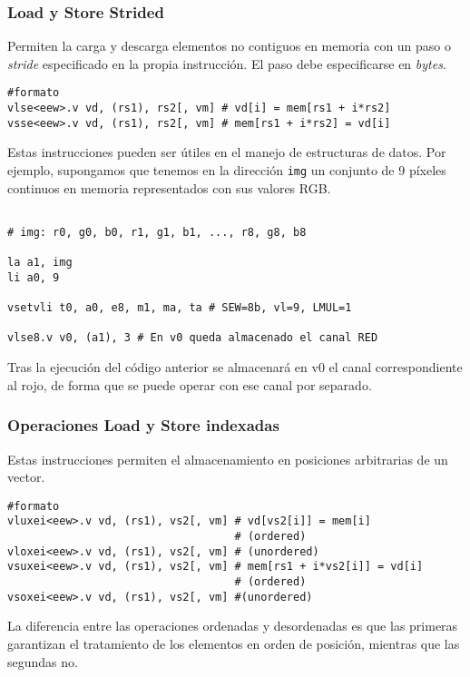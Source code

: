 \subsubsection{Load y Store Strided}
Permiten la carga y descarga elementos no contiguos en memoria con un paso o
\textit{stride} especificado en la propia instrucción. El paso debe
especificarse en \textit{bytes}.

\begin{lstlisting}
#formato
vlse<eew>.v vd, (rs1), rs2[, vm] # vd[i] = mem[rs1 + i*rs2]
vsse<eew>.v vd, (rs1), rs2[, vm] # mem[rs1 + i*rs2] = vd[i]
\end{lstlisting}

Estas instrucciones pueden ser útiles en el manejo de estructuras de datos. Por
ejemplo, supongamos que tenemos en la dirección \texttt{img} un conjunto de 9
píxeles continuos en memoria representados con sus valores RGB.

\begin{lstlisting}

# img: r0, g0, b0, r1, g1, b1, ..., r8, g8, b8

la a1, img
li a0, 9

vsetvli t0, a0, e8, m1, ma, ta # SEW=8b, vl=9, LMUL=1

vlse8.v v0, (a1), 3 # En v0 queda almacenado el canal RED

\end{lstlisting}

Tras la ejecución del código anterior se almacenará en v0 el canal correspondiente al rojo, de forma que
se puede operar con ese canal por separado.

\subsubsection{Operaciones Load y Store indexadas}
Estas instrucciones permiten el almacenamiento en posiciones arbitrarias de un vector.

\begin{lstlisting}
#formato
vluxei<eew>.v vd, (rs1), vs2[, vm] # vd[vs2[i]] = mem[i]
                                   # (ordered)
vloxei<eew>.v vd, (rs1), vs2[, vm] # (unordered)
vsuxei<eew>.v vd, (rs1), vs2[, vm] # mem[rs1 + i*vs2[i]] = vd[i] 
                                   # (ordered)
vsoxei<eew>.v vd, (rs1), vs2[, vm] #(unordered)
\end{lstlisting}

La diferencia entre las operaciones ordenadas y desordenadas es que las
primeras garantizan el tratamiento de los elementos en orden de posición,
mientras que las segundas no.

